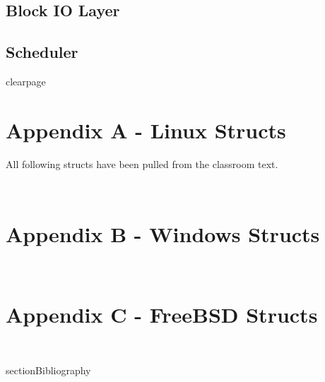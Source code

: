 \documentclass[10pt,letterpaper,onecolumn,draftclsnofoot]{IEEEtran}
\begin{document}
 \subsection{Block IO Layer}
 \subsection{Scheduler}
clearpage
\section{Appendix A - Linux Structs}
All following structs have been pulled from the classroom text. \cite{robertlove2010}
\begin{lstlisting}


\end{lstlisting}

\section{Appendix B - Windows Structs}
\begin{lstlisting}


\end{lstlisting}
\section{Appendix C - FreeBSD Structs}
\begin{lstlisting}


\end{lstlisting}

section{Bibliography}


\end{document}
